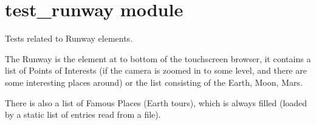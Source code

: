 \documentclass[letterpaper,10pt,english]{sphinxmanual}
\begin{document}
\section{test\_runway module}
\label{test_runway:test-runway-module}\label{test_runway:module-test_runway}\label{test_runway::doc}
Tests related to Runway elements.

The Runway is the element at to bottom of the touchscreen browser,
it contains a list of Points of Interests
(if the camera is zoomed in to some level, and there are some
interesting places around) or the list consisting of the Earth, Moon, Mars.

There is also a list of Famous Places (Earth tours), which is always
filled (loaded by a static list of entries read from a file).
\end{document}
